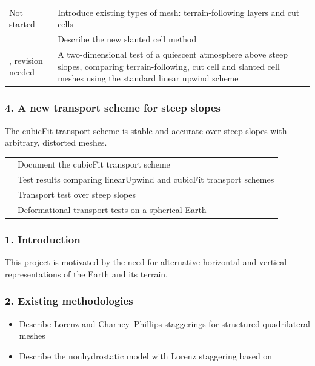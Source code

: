 \documentclass[a4paper,11pt]{article}
\begin{document}
\begin{tabularx}{\linewidth}{>{\hsize=2.2in}X X}
Not started & Introduce existing types of mesh: terrain-following layers and cut cells \\
\citet{shaw-weller2016,shaw2017} & Describe the new slanted cell method \\
\citet{shaw-weller2016}, revision needed & A two-dimensional test of a quiescent atmosphere above steep slopes, comparing terrain-following, cut cell and slanted cell meshes using the standard linear upwind scheme \\
\end{tabularx}

\subsubsection*{4. A new transport scheme for steep slopes}
\noindent The cubicFit transport scheme is stable and accurate over steep slopes with arbitrary, distorted meshes.


\begin{tabularx}{\linewidth}{>{\hsize=2.2in}X X}
	\citet{shaw2017} & Document the cubicFit transport scheme \\
	 & Test results comparing linearUpwind and cubicFit transport schemes \\
	\citet{shaw2017} & Transport test over steep slopes \\
	\citet{shaw2017} & Deformational transport tests on a spherical Earth \citep{lauritzen2012} \\
\end{tabularx}

\subsubsection*{1. Introduction}
\noindent This project is motivated by the need for alternative horizontal and vertical representations of the Earth and its terrain.

\subsubsection*{2. Existing methodologies}
\begin{itemize}[itemsep=0.1em]
	\item Describe Lorenz and Charney--Phillips staggerings for structured quadrilateral meshes
	\item Describe the nonhydrostatic model with Lorenz staggering based on \citep{weller-shahrokhi2014}
\end{itemize}
\end{document}
